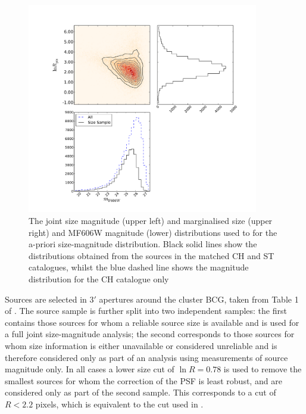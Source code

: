 \documentclass[useAMS,usenatbib,times,letter,amssymb]{mn2e}
\begin{document}
\begin{figure}
\centering
\includegraphics[width = 0.9\textwidth]{Figures/Data/Distributions/STAGES_Size-Mag_Distribution_withRRGMagComp.pdf}
\caption{The joint size magnitude (upper left) and marginalised size (upper right) and MF606W magnitude (lower) distributions used to for the a-priori size-magnitude distribution. Black solid lines show the distributions obtained from the sources in the matched CH and ST catalogues, whilst the blue dashed line shows the magnitude distribution for the CH catalogue only} \label{fig:SizeMag_Distribution_Master}
\end{figure}


Sources are selected in $3'$ apertures around the cluster BCG, taken from Table 1 of \cite{Heymans:2008p2060}. The source sample is further split into two independent samples: the first contains those sources for whom a reliable source size is available and is used for a full joint size-magnitude analysis; the second corresponds to those sources for whom size information is either unavailable or considered unreliable and is therefore considered only as part of an analysis using measurements of source magnitude only. In all cases a lower size cut of $\ln R = 0.78$ is used to remove the smallest sources for whom the correction of the PSF is least robust, and are considered only as part of the second sample. This corresponds to a cut of $R < 2.2$ pixels, which is equivalent to the cut used in \cite{Schmidt:2012p1106}.
\end{document}
